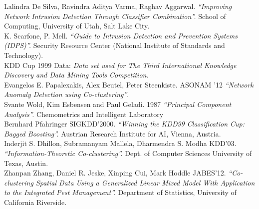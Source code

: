 \documentclass{acm_proc_article-sp}
\begin{document}
\begin{thebibliography}{9} 
	Lalindra De Silva, Ravindra Aditya Varma, Raghav Aggarwal. \emph{``Improving Network Intrusion Detection Through Classifier Combination''.} School of Computing, University of Utah, Salt Lake City.\\
	
	K. Scarfone, P. Mell. \emph{``Guide to Intrusion Detection and Prevention Systems (IDPS)''.}  Security Resource Center (National Institute of Standards and Technology).\\
	
	KDD Cup 1999 Data: \emph{Data set used for The Third International Knowledge Discovery and Data Mining Tools Competition.}\\
	
	 Evangelos E. Papalexakis, Alex Beutel, Peter Steenkiste. ASONAM '12 \emph{``Network Anomaly Detection using Co-clustering''.}\\
	
	 Svante Wold, Kim Esbensen and Paul Geladi. 1987 \emph{``Principal Component Analysis''.} Chemometrics and Intelligent Laboratory \\
	
	 Bernhard Pfahringer SIGKDD'2000. \emph{``Winning the KDD99 Classification Cup: Bagged Boosting''.} Austrian Research Institute for AI, Vienna, Austria.\\
	
	Inderjit S. Dhillon, Subramanyam Mallela, Dharmendra S. Modha KDD'03. \emph{``Information-Theoretic Co-clustering''.} Dept. of Computer Sciences
	University of Texas, Austin.\\
	
	Zhanpan Zhang, Daniel R. Jeske, Xinping Cui, Mark Hoddle JABES'12. \emph{``Co-clustering Spatial Data Using a Generalized Linear Mixed Model With Application to the Integrated Pest Management''.} Department of Statistics, University of California Riverside.\\
\end{thebibliography}

\end{document}
